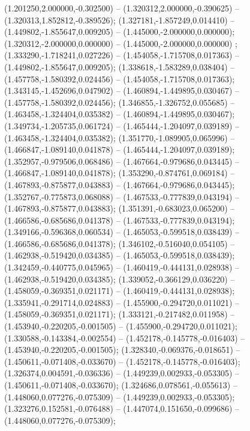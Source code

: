  (1.201250,2.000000,-0.302500) -- (1.320312,2.000000,-0.390625) -- (1.320313,1.852812,-0.389526);
 (1.327181,-1.857249,0.014410) -- (1.449802,-1.855647,0.009205) -- (1.445000,-2.000000,0.000000);
 (1.320312,-2.000000,0.000000) -- (1.445000,-2.000000,0.000000) ;
 (1.333290,-1.718241,0.027226) -- (1.454058,-1.715708,0.017363) -- (1.449802,-1.855647,0.009205);
 (1.338618,-1.583289,0.038404) -- (1.457758,-1.580392,0.024456) -- (1.454058,-1.715708,0.017363);
 (1.343145,-1.452696,0.047902) -- (1.460894,-1.449895,0.030467) -- (1.457758,-1.580392,0.024456);
 (1.346855,-1.326752,0.055685) -- (1.463458,-1.324404,0.035382) -- (1.460894,-1.449895,0.030467);
 (1.349734,-1.205735,0.061724) -- (1.465444,-1.204097,0.039189) -- (1.463458,-1.324404,0.035382);
 (1.351770,-1.089905,0.065996) -- (1.466847,-1.089140,0.041878) -- (1.465444,-1.204097,0.039189);
 (1.352957,-0.979506,0.068486) -- (1.467664,-0.979686,0.043445) -- (1.466847,-1.089140,0.041878);
 (1.353290,-0.874761,0.069184) -- (1.467893,-0.875877,0.043883) -- (1.467664,-0.979686,0.043445);
 (1.352767,-0.775873,0.068088) -- (1.467533,-0.777839,0.043194) -- (1.467893,-0.875877,0.043883);
 (1.351391,-0.683023,0.065200) -- (1.466586,-0.685686,0.041378) -- (1.467533,-0.777839,0.043194);
 (1.349166,-0.596368,0.060534) -- (1.465053,-0.599518,0.038439) -- (1.466586,-0.685686,0.041378);
 (1.346102,-0.516040,0.054105) -- (1.462938,-0.519420,0.034385) -- (1.465053,-0.599518,0.038439);
 (1.342459,-0.440775,0.045965) -- (1.460419,-0.444131,0.028938) -- (1.462938,-0.519420,0.034385);
 (1.339052,-0.366129,0.036220) -- (1.458059,-0.369351,0.021171) -- (1.460419,-0.444131,0.028938);
 (1.335941,-0.291714,0.024883) -- (1.455900,-0.294720,0.011021) -- (1.458059,-0.369351,0.021171);
 (1.333121,-0.217482,0.011958) -- (1.453940,-0.220205,-0.001505) -- (1.455900,-0.294720,0.011021);
 (1.330588,-0.143384,-0.002554) -- (1.452178,-0.145778,-0.016403) -- (1.453940,-0.220205,-0.001505);
 (1.328340,-0.069376,-0.018651) -- (1.450611,-0.071408,-0.033670) -- (1.452178,-0.145778,-0.016403);
 (1.326374,0.004591,-0.036336) -- (1.449239,0.002933,-0.053305) -- (1.450611,-0.071408,-0.033670);
 (1.324686,0.078561,-0.055613) -- (1.448060,0.077276,-0.075309) -- (1.449239,0.002933,-0.053305);
 (1.323276,0.152581,-0.076488) -- (1.447074,0.151650,-0.099686) -- (1.448060,0.077276,-0.075309);
